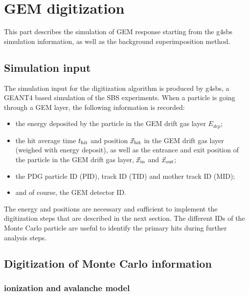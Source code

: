 \section{GEM digitization}
\label{digitization}

This part describes the simulation of GEM response starting from the g4sbs simulation information, as well as the background superimposition method.

\subsection{Simulation input}
\label{simu_input}

The simulation input for the digitization algorithm is produced by g4sbs, a GEANT4 based simulation of the SBS experiments.
When a particle is going through a GEM layer, the following information is recorded:
%
\begin{itemize}
\item{the energy deposited by the particle in the GEM drift gas layer $E_{dep}$;}
\item{the hit average time $t_{\rm hit}$ and position $\vec{x}_{\rm hit}$ in the GEM drift gas layer (weighed with energy deposit), as well as the entrance and exit position of the particle in the GEM drift gas layer, $\vec{x}_{\rm in}$ and $\vec{x}_{\rm out}$;}
\item{the PDG particle ID (PID), track ID (TID) and mother track ID (MID);}
\item{and of course, the GEM detector ID.}
\end{itemize}
%
The energy and positions are necessary and sufficient to implement the digitization steps that are described in the next section.
The different IDs of the Monte Carlo particle are useful to identify the primary hits during further analysis steps.

\subsection{Digitization of Monte Carlo information}
\label{digi_mc}

\subsubsection{ionization and avalanche model}
\label{ava_model}

